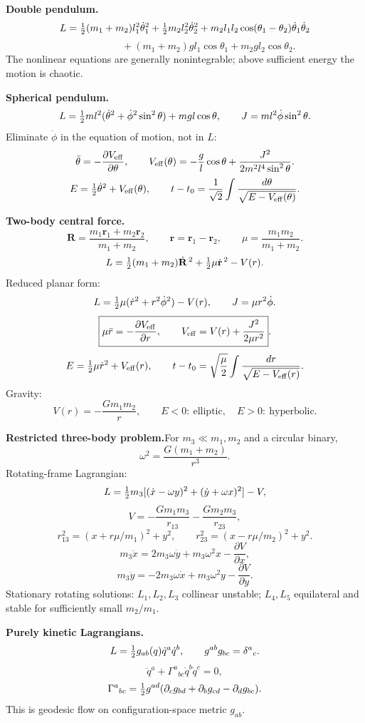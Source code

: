 \noindent\textbf{Double pendulum.}\quad
\[
L=\tfrac{1}{2}(m_1+m_2)l_1^2\dot\theta_1^2
+\tfrac{1}{2} m_2l_2^2\dot\theta_2^2
+m_2l_1l_2\cos(\theta_1-\theta_2)\dot\theta_1\dot\theta_2
\]
\[
\hspace{2cm}
+(m_1+m_2)gl_1\cos\theta_1+m_2gl_2\cos\theta_2.
\]
The nonlinear equations are generally nonintegrable; above sufficient energy the
motion is chaotic.

\noindent\textbf{Spherical pendulum.}\quad
\[
L=\tfrac{1}{2} ml^2(\dot\theta^2+\dot\phi^2\sin^2\theta)+mgl\cos\theta,
\qquad
J=ml^2\dot\phi\sin^2\theta.
\]
Eliminate $\dot\phi$ in the equation of motion, not in $L$:
\[
\ddot\theta=-\frac{\partial V_{\rm eff}}{\partial\theta},
\qquad
V_{\rm eff}(\theta)
=-\frac{g}{l}\cos\theta+\frac{J^2}{2m^2l^4\sin^2\theta}.
\]
\[
E=\tfrac{1}{2}\dot\theta^2+V_{\rm eff}(\theta),\qquad
t-t_0=\frac{1}{\sqrt2}\int
\frac{d\theta}{\sqrt{E-V_{\rm eff}(\theta)}}.
\]

\noindent\textbf{Two-body central force.}\quad
\[
\mathbf R=\frac{m_1\mathbf r_1+m_2\mathbf r_2}{m_1+m_2},\qquad
\mathbf r=\mathbf r_1-\mathbf r_2,\qquad
\mu=\frac{m_1m_2}{m_1+m_2}.
\]
\[
L=\tfrac{1}{2}(m_1+m_2)\dot{\mathbf R}^{\,2}
+\tfrac{1}{2}\mu\dot{\mathbf r}^{\,2}-V(r).
\]
Reduced planar form:
\[
L=\tfrac{1}{2}\mu(\dot r^2+r^2\dot\phi^2)-V(r),\qquad
J=\mu r^2\dot\phi.
\]
\[
\boxed{\mu\ddot r=-\frac{\partial V_{\rm eff}}{\partial r},\qquad
V_{\rm eff}=V(r)+\frac{J^2}{2\mu r^2}}.
\]
\[
E=\tfrac{1}{2}\mu\dot r^2+V_{\rm eff}(r),\qquad
t-t_0=\sqrt{\frac{\mu}{2}}\int\frac{dr}{\sqrt{E-V_{\rm eff}(r)}}.
\]
Gravity:
\[
V(r)=-\frac{Gm_1m_2}{r},\qquad
E<0:\ \text{elliptic},\quad E>0:\ \text{hyperbolic}.
\]

\noindent\textbf{Restricted three-body problem.}\quad For
$m_3\ll m_1,m_2$ and a circular binary,
\[
\omega^2=\frac{G(m_1+m_2)}{r^3}.
\]
Rotating-frame Lagrangian:
\[
L=\tfrac{1}{2} m_3[(\dot x-\omega y)^2+(\dot y+\omega x)^2]-V,
\]
\[
V=-\frac{Gm_1m_3}{r_{13}}-\frac{Gm_2m_3}{r_{23}},
\]
\[
r_{13}^2=(x+r\mu/m_1)^2+y^2,\qquad
r_{23}^2=(x-r\mu/m_2)^2+y^2.
\]
\[
m_3\ddot x=2m_3\omega\dot y+m_3\omega^2x-\frac{\partial V}{\partial x},
\]
\[
m_3\ddot y=-2m_3\omega\dot x+m_3\omega^2y-\frac{\partial V}{\partial y}.
\]
Stationary rotating solutions: $L_1,L_2,L_3$ collinear unstable; $L_4,L_5$
equilateral and stable for sufficiently small $m_2/m_1$.

\noindent\textbf{Purely kinetic Lagrangians.}\quad
\[
L=\tfrac{1}{2} g_{ab}(q)\dot q^a\dot q^b,\qquad
g^{ab}g_{bc}=\delta^a{}_c.
\]
\[
\boxed{\ddot q^a+\Gamma^a{}_{bc}\dot q^b\dot q^c=0},
\]
\[
\Gamma^a{}_{bc}
=\tfrac{1}{2} g^{ad}(\partial_cg_{bd}+\partial_bg_{cd}-\partial_dg_{bc}).
\]
This is geodesic flow on configuration-space metric $g_{ab}$.

